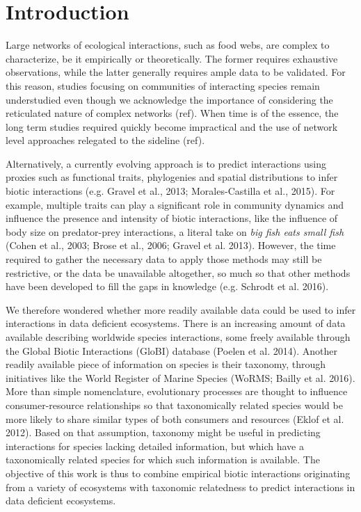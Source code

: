 \documentclass[letterpaper]{article}
\begin{document}
\section{Introduction}

Large networks of ecological interactions, such as food webs, are complex to characterize, be it empirically or theoretically. The former requires exhaustive observations, while the latter generally requires ample data to be validated. For this reason, studies focusing on communities of interacting species remain understudied even though we acknowledge the importance of considering the reticulated nature of complex networks (ref). When time is of the essence, the long term studies required quickly become impractical and the use of network level approaches relegated to the sideline (ref).

Alternatively, a currently evolving approach is to predict interactions using proxies such as functional traits, phylogenies and spatial distributions to infer biotic interactions (e.g. Gravel et al., 2013; Morales-Castilla et al., 2015). For example, multiple traits can play a significant role in community dynamics and influence the presence and intensity of biotic interactions, like the influence of body size on predator-prey interactions, a literal take on \textit{big fish eats small fish} (Cohen et al., 2003; Brose et al., 2006; Gravel et al. 2013). However, the time required to gather the necessary data to apply those methods may still be restrictive, or the data be unavailable altogether, so much so that other methods have been developed to fill the gaps in knowledge (e.g. Schrodt et al. 2016).

We therefore wondered whether more readily available data could be used to infer interactions in data deficient ecosystems. There is an increasing amount of data available describing worldwide species interactions, some freely available through the Global Biotic Interactions (GloBI) database (Poelen et al. 2014). Another readily available piece of information on species is their taxonomy, through initiatives like the World Register of Marine Species (WoRMS; Bailly et al. 2016). More than simple nomenclature, evolutionary processes are thought to influence consumer-resource relationships so that taxonomically related species would be more likely to share similar types of both consumers and resources (Eklof et al. 2012). Based on that assumption, taxonomy might be useful in predicting interactions for species lacking detailed information, but which have a taxonomically related species for which such information is available. The objective of this work is thus to combine empirical biotic interactions originating from a variety of ecosystems with taxonomic relatedness to predict interactions in data deficient ecosystems.
\end{document}
